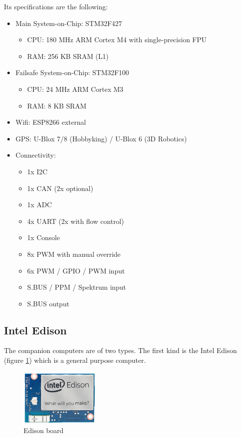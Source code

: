 Its specifications are the following:
\begin{itemize}
  \item Main System-on-Chip: STM32F427
        \begin{itemize}
          \item CPU: 180 MHz ARM Cortex M4 with single-precision FPU
          \item RAM: 256 KB SRAM (L1)
        \end{itemize}

  \item Failsafe System-on-Chip: STM32F100
        \begin{itemize}
          \item CPU: 24 MHz ARM Cortex M3
          \item RAM: 8 KB SRAM
        \end{itemize}

  \item Wifi: ESP8266 external
  \item GPS: U-Blox 7/8 (Hobbyking) / U-Blox 6 (3D Robotics)
  \item Connectivity:
    \begin{itemize}
      \item 1x I2C
      \item 1x CAN (2x optional)
      \item 1x ADC
      \item 4x UART (2x with flow control)
      \item 1x Console
      \item 8x PWM with manual override
      \item 6x PWM / GPIO / PWM input
      \item S.BUS / PPM / Spektrum input
      \item S.BUS output
    \end{itemize}
\end{itemize}

\subsection{Intel Edison}
The companion computers are of two types.
The first kind is the Intel Edison (figure \ref{fig:hardware_edison})%
which is a general purpose computer.

\begin{figure}[h]
\centering
\includegraphics[width=0.35\textwidth]{chapters/chapter-03/figures/hardware_edison.png}
\caption{Edison board}
\label{fig:hardware_edison}
\end{figure}

